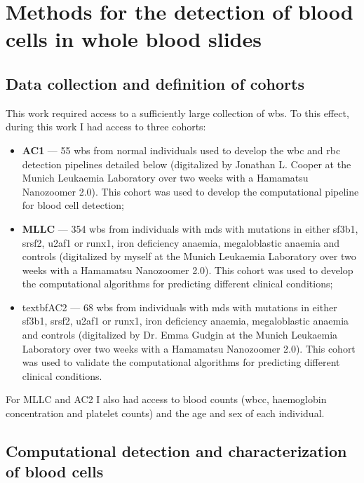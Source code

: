\section{Methods for the detection of blood cells in whole blood slides}

\subsection{Data collection and definition of cohorts}

This work required access to a sufficiently large collection of \ac{wbs}. To this effect, during this work I had access to three cohorts:

\begin{itemize}
    \item \textbf{AC1} --- 55 \ac{wbs} from normal individuals used to develop the \ac{wbc} and \ac{rbc} detection pipelines detailed below (digitalized by Jonathan L. Cooper at the Munich Leukaemia Laboratory over two weeks with a Hamamatsu Nanozoomer 2.0). This cohort was used to develop the computational pipeline for blood cell detection;
    \item \textbf{MLLC} --- 354 \ac{wbs} from individuals with \ac{mds} with mutations in either \ac{sf3b1}, \ac{srsf2}, \ac{u2af1} or \ac{runx1}, iron deficiency anaemia, megaloblastic anaemia and controls (digitalized by myself at the Munich Leukaemia Laboratory over two weeks with a Hamamatsu Nanozoomer 2.0). This cohort was used to develop the computational algorithms for predicting different clinical conditions;
    \item textbf{AC2} --- 68 \ac{wbs} from individuals with \ac{mds} with mutations in either \ac{sf3b1}, \ac{srsf2}, \ac{u2af1} or \ac{runx1}, iron deficiency anaemia, megaloblastic anaemia and controls (digitalized by Dr. Emma Gudgin at the Munich Leukaemia Laboratory over two weeks with a Hamamatsu Nanozoomer 2.0). This cohort was used to validate the computational algorithms for predicting different clinical conditions.
\end{itemize}

For MLLC and AC2 I also had access to blood counts (\ac{wbcc}, haemoglobin concentration and platelet counts) and the age and sex of each individual. 

\subsection{Computational detection and characterization of blood cells}

